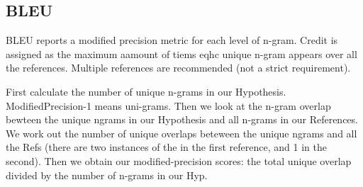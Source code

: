 \documentclass[11pt]{article}
\begin{document}
\subsection{BLEU}

BLEU reports a modified precision metric for each level of n-gram. Credit is assigned as the maximum aamount of tiems eqhc unique n-gram appears over all the references. Multiple references are recommended (not a strict requirement).

\begin{minipage}[l]{0.5\linewidth}
    \centering
\end{minipage}\hfill
\begin{minipage}[l]{0.5\linewidth}
    First calculate the number of unique n-grams in our Hypothesis. ModifiedPrecision-1 means uni-grams. Then we look at the n-gram overlap bewteen the unique ngrams in our Hypothesis and all n-grams in our References. We work out the number of unique overlaps beteween the unique ngrams and all the Refs (there are two instances of the in the first reference, and 1 in the second). Then we obtain our modified-precision scores: the total unique overlap divided by the number of n-grams in our Hyp.
\end{minipage}
\end{document}
